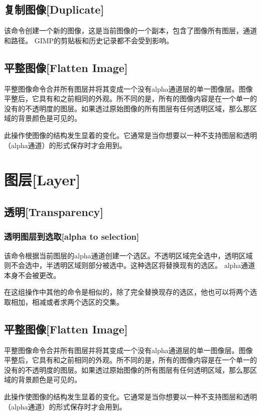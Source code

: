 \subsection{复制图像[Duplicate]} 
该命令创建一个新的图像，这是当前图像的一个副本，包含了图像所有图层，通道和路径。 GIMP的剪贴板和历史记录都不会受到影响。

\subsection{平整图像[Flatten Image]}
平整图像命令合并所有图层并将其变成一个没有alpha通道层的单一图像层。图像平整后，它具有和之前相同的外观。所不同的是，所有的图像内容是在一个单一的没有的不透明度的图层。如果透过原始图像的所有图层有任何透明区域，那么那区域的背景颜色是可见的。

此操作使图像的结构发生显着的变化。它通常是当你想要以一种不支持图层和透明（alpha通道）的形式保存时才会用到。

\clearpage


\section{图层[Layer]}
\subsection{透明[Transparency]}
\subsubsection{透明图层到选取[alpha to selection]} 
该命令根据当前图层的alpha通道创建一个选区。不透明区域完全选中，透明区域则不会选中，半透明区域则部分被选中。这种选区将替换现有的选区。 alpha通道本身不会被更改。

在这组操作中其他的命令是相似的，除了完全替换现存的选区，他也可以将两个选取相加，相减或者求两个选区的交集。

\subsection{平整图像[Flatten Image]}
平整图像命令合并所有图层并将其变成一个没有alpha通道层的单一图像层。图像平整后，它具有和之前相同的外观。所不同的是，所有的图像内容是在一个单一的没有的不透明度的图层。如果透过原始图像的所有图层有任何透明区域，那么那区域的背景颜色是可见的。

此操作使图像的结构发生显着的变化。它通常是当你想要以一种不支持图层和透明（alpha通道）的形式保存时才会用到。

\clearpage